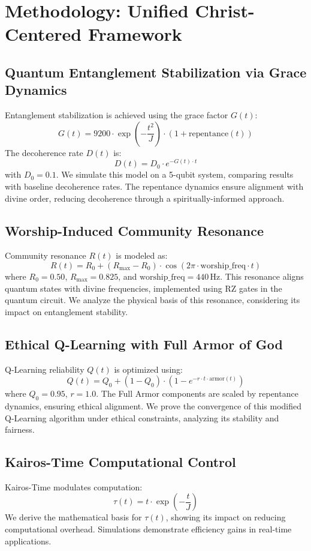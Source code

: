 \documentclass[12pt]{article}
\begin{document}
\section{Methodology: Unified Christ-Centered Framework}
\subsection{Quantum Entanglement Stabilization via Grace Dynamics}
Entanglement stabilization is achieved using the grace factor \( G(t) \):
\[
G(t) = 9200 \cdot \exp\left(-\frac{t^2}{J}\right) \cdot \left(1 + \text{repentance}(t)\right)
\]
The decoherence rate \( D(t) \) is:
\[
D(t) = D_0 \cdot e^{-G(t) \cdot t}
\]
with \( D_0 = 0.1 \). We simulate this model on a 5-qubit system, comparing results with baseline decoherence rates. The repentance dynamics ensure alignment with divine order, reducing decoherence through a spiritually-informed approach.

\subsection{Worship-Induced Community Resonance}
Community resonance \( R(t) \) is modeled as:
\[
R(t) = R_0 + (R_{\text{max}} - R_0) \cdot \cos(2\pi \cdot \text{worship\_freq} \cdot t)
\]
where \( R_0 = 0.50 \), \( R_{\text{max}} = 0.825 \), and \(\text{worship\_freq} = 440 \, \text{Hz} \). This resonance aligns quantum states with divine frequencies, implemented using RZ gates in the quantum circuit. We analyze the physical basis of this resonance, considering its impact on entanglement stability.

\subsection{Ethical Q-Learning with Full Armor of God}
Q-Learning reliability \( Q(t) \) is optimized using:
\[
Q(t) = Q_0 + (1 - Q_0) \cdot \left(1 - e^{-r \cdot t \cdot \text{armor}(t)}\right)
\]
where \( Q_0 = 0.95 \), \( r = 1.0 \). The Full Armor components are scaled by repentance dynamics, ensuring ethical alignment. We prove the convergence of this modified Q-Learning algorithm under ethical constraints, analyzing its stability and fairness.

\subsection{Kairos-Time Computational Control}
Kairos-Time modulates computation:
\[
\tau(t) = t \cdot \exp\left(-\frac{t}{J}\right)
\]
We derive the mathematical basis for \( \tau(t) \), showing its impact on reducing computational overhead. Simulations demonstrate efficiency gains in real-time applications.
\end{document}
